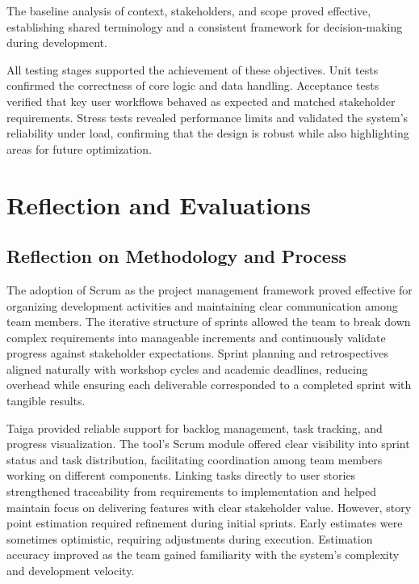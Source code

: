 \documentclass[12pt,a4paper]{article}
\begin{document}
The baseline analysis of context, stakeholders, and scope proved effective, establishing shared terminology and a consistent framework for decision-making during development.

All testing stages supported the achievement of these objectives. Unit tests confirmed the correctness of core logic and data handling. Acceptance tests verified that key user workflows behaved as expected and matched stakeholder requirements. Stress tests revealed performance limits and validated the system’s reliability under load, confirming that the design is robust while also highlighting areas for future optimization.

\section{Reflection and Evaluations}

\subsection{Reflection on Methodology and Process}
The adoption of Scrum as the project management framework proved effective for organizing development activities and maintaining clear communication among team members. The iterative structure of sprints allowed the team to break down complex requirements into manageable increments and continuously validate progress against stakeholder expectations. Sprint planning and retrospectives aligned naturally with workshop cycles and academic deadlines, reducing overhead while ensuring each deliverable corresponded to a completed sprint with tangible results.\newline

Taiga provided reliable support for backlog management, task tracking, and progress visualization. The tool's Scrum module offered clear visibility into sprint status and task distribution, facilitating coordination among team members working on different components. Linking tasks directly to user stories strengthened traceability from requirements to implementation and helped maintain focus on delivering features with clear stakeholder value. However, story point estimation required refinement during initial sprints. Early estimates were sometimes optimistic, requiring adjustments during execution. Estimation accuracy improved as the team gained familiarity with the system's complexity and development velocity.\newline
\end{document}
